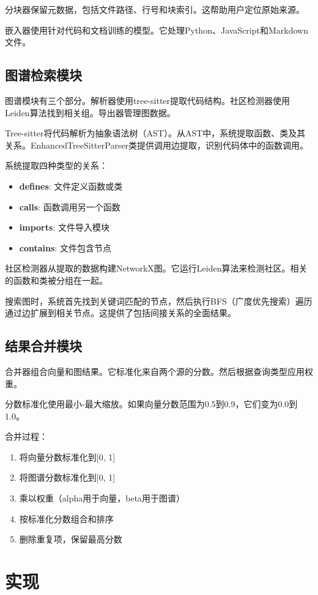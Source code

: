 \documentclass[11pt]{article}
\begin{document}
分块器保留元数据，包括文件路径、行号和块索引。这帮助用户定位原始来源。

嵌入器使用针对代码和文档训练的模型。它处理Python、JavaScript和Markdown文件。

\subsection{图谱检索模块}
图谱模块有三个部分。解析器使用tree-sitter提取代码结构。社区检测器使用Leiden算法找到相关组。导出器管理图数据。

Tree-sitter将代码解析为抽象语法树（AST）。从AST中，系统提取函数、类及其关系。EnhancedTreeSitterParser类提供调用边提取，识别代码体中的函数调用。

系统提取四种类型的关系：
\begin{itemize}
    \item \textbf{defines}: 文件定义函数或类
    \item \textbf{calls}: 函数调用另一个函数
    \item \textbf{imports}: 文件导入模块
    \item \textbf{contains}: 文件包含节点
\end{itemize}

社区检测器从提取的数据构建NetworkX图。它运行Leiden算法来检测社区。相关的函数和类被分组在一起。

搜索图时，系统首先找到关键词匹配的节点，然后执行BFS（广度优先搜索）遍历通过边扩展到相关节点。这提供了包括间接关系的全面结果。

\subsection{结果合并模块}
合并器组合向量和图结果。它标准化来自两个源的分数。然后根据查询类型应用权重。

分数标准化使用最小-最大缩放。如果向量分数范围为0.5到0.9，它们变为0.0到1.0。

合并过程：
\begin{enumerate}
    \item 将向量分数标准化到[0, 1]
    \item 将图谱分数标准化到[0, 1]
    \item 乘以权重（alpha用于向量，beta用于图谱）
    \item 按标准化分数组合和排序
    \item 删除重复项，保留最高分数
\end{enumerate}

\section{实现}
\end{document}
